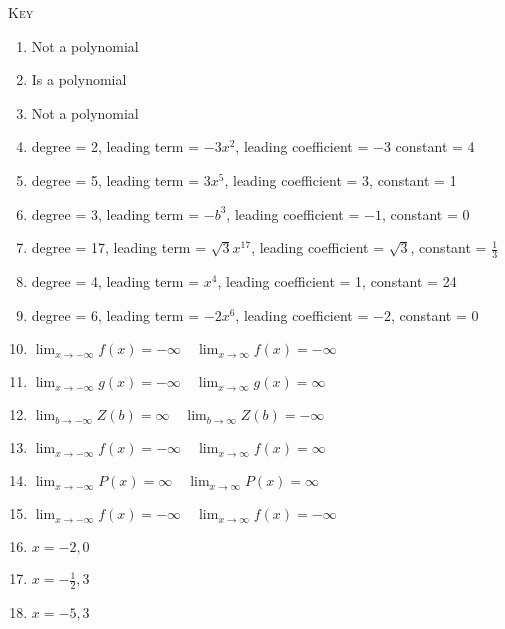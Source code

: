 \documentclass{article}
\begin{document}
\textsc{Key}
\begin{enumerate}
	\item Not a polynomial
	\item Is a polynomial
	\item Not a polynomial
	\item degree = 2, leading term = $-3x^2$, leading coefficient = $-3$ constant = 4
	\item degree = 5, leading term = $3x^5$, leading coefficient = 3, constant = 1
	\item degree = 3, leading term = $-b^3$, leading coefficient = $-1$, constant = 0
	\item degree = 17, leading term = $\sqrt{3}x^{17}$, leading coefficient = $\sqrt{3}$, constant = $\frac{1}{3}$
	\item degree = 4, leading term = $x^4$, leading coefficient = 1, constant = 24
	\item degree = 6, leading term = $-2x^6$, leading coefficient = $-2$, constant = 0
	\item $\lim_{x\to -\infty}f(x) = -\infty \quad \lim_{x\to \infty}f(x) = -\infty$
	\item $\lim_{x\to -\infty}g(x) = -\infty \quad \lim_{x\to \infty}g(x) = \infty$
	\item $\lim_{b\to -\infty}Z(b) = \infty \quad \lim_{b\to \infty}Z(b) = -\infty$
	\item $\lim_{x\to -\infty}f(x) = -\infty \quad \lim_{x\to \infty}f(x) = \infty$
	\item $\lim_{x\to -\infty}P(x) = \infty \quad \lim_{x\to \infty}P(x) = \infty$
	\item $\lim_{x\to -\infty}f(x) = -\infty \quad \lim_{x\to \infty}f(x) = -\infty$
	\item $x = -2, 0$
	\item $x = -\frac{1}{2}, 3$
	\item $x = -5, 3$
\end{enumerate}
\end{document}
